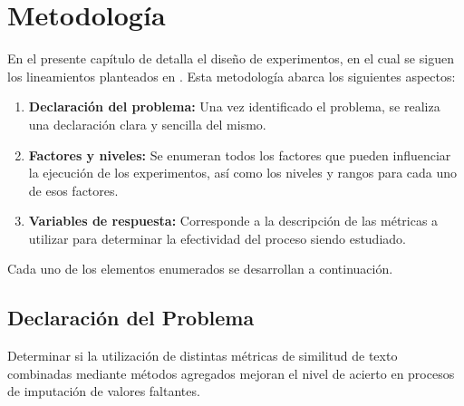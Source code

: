 \chapter{Metodología}
En el presente capítulo de detalla el diseño de experimentos, en el cual se siguen los lineamientos planteados en \cite{montgomery2008design}. Esta metodología abarca los siguientes aspectos:
\begin{enumerate}
  \item \textbf{Declaración del problema:} Una vez identificado el problema, se realiza una declaración clara y sencilla del mismo.
  \item \textbf{Factores y niveles:} Se enumeran todos los factores que pueden influenciar la ejecución de los experimentos, así como los niveles y rangos para cada uno de esos factores.
  \item \textbf{Variables de respuesta:} Corresponde a la descripción de las métricas a utilizar para determinar la efectividad del proceso siendo estudiado.
\end{enumerate}
Cada uno de los elementos enumerados se desarrollan a continuación.
\section{Declaración del Problema}
Determinar si la utilización de distintas métricas de similitud de texto combinadas mediante métodos agregados mejoran el nivel de acierto en procesos de imputación de valores faltantes.

